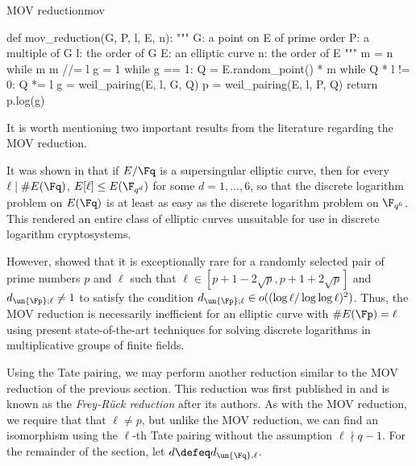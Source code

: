 \begin{alg}{MOV reduction}{mov}
\begin{sagecode}
def mov_reduction(G, P, l, E, n):
    """
    G: a point on E of prime order
    P: a multiple of G
    l: the order of G
    E: an elliptic curve
    n: the order of E
    """
    m = n
    while m %
        m //= l
    g = 1
    while g == 1:
        Q = E.random_point() * m
        while Q * l != 0:
            Q *= l
        g = weil_pairing(E, l, G, Q)
    p = weil_pairing(E, l, P, Q)
    return p.log(g)
\end{sagecode}
\end{alg}

It is worth mentioning two important results from the literature regarding the MOV reduction.

It was shown in \citep{MOV} that if $E / \Fq$ is a supersingular elliptic curve, then for every $\ell \mid \#E(\Fq)$, $E[\ell] \leq E(\F_{q^d})$ for some $d = 1, \ldots, 6$, so that the discrete logarithm problem on $E(\Fq)$ is at least as easy as the discrete logarithm problem on $\F_{q^6}$. This rendered an entire class of elliptic curves unsuitable for use in discrete logarithm cryptosystems.

However, \citep{BalaKob} showed that it is exceptionally rare for a randomly selected pair of prime numbers $p$ and $\ell$ such that $\ell \in [p+1-2\sqrt{p}, p+1+2\sqrt{p}]$ and $d_{\un{\Fp};\ell} \neq 1$ to satisfy the condition $d_{\un{\Fp};\ell} \in o((\log \ell / \log\log \ell)^2)$. Thus, the MOV reduction is necessarily inefficient for an elliptic curve with $\#E(\Fp) = \ell$ using present state-of-the-art techniques for solving discrete logarithms in multiplicative groups of finite fields.



Using the Tate pairing, we may perform another reduction similar to the MOV reduction of the previous section. This reduction was first published in \citep{FreyRuck} and is known as the \emph{Frey-R\"uck reduction} after its authors. As with the MOV reduction, we require that that $\ell \neq p$, but unlike the MOV reduction, we can find an isomorphism using the $\ell$-th Tate pairing without the assumption $\ell \nmid q - 1$. For the remainder of the section, let $d \defeq d_{\un{\Fq},\ell}$.

